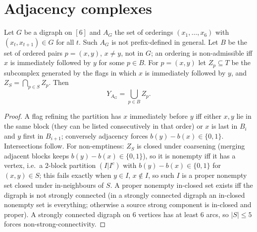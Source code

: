 \section{Adjacency complexes}\label{sec:adjacency}
Let $G$ be a digraph on $[6]$ and $A_G$ the set of orderings $(x_1,\dots,x_6)$ with $(x_t,x_{t+1})\in G$ for all $t$. Such $A_G$ is not prefix-defined in general. Let $B$ be the set of ordered pairs $p=(x,y)$, $x\ne y$, not in $G$; an ordering is non-admissible iff $x$ is immediately followed by $y$ for some $p\in B$. For $p=(x,y)$ let $Z_p\subseteq T$ be the subcomplex generated by the flags in which $x$ is immediately followed by $y$, and $Z_S=\bigcap_{p\in S}Z_p$. Then
\[
Y_{A_G}=\bigcup_{p\in B}Z_p .
\]
\begin{proof}
A flag refining the partition has $x$ immediately before $y$ iff either $x,y$ lie in the same block (they can be listed consecutively in that order) or $x$ is last in $B_i$ and $y$ first in $B_{i+1}$; conversely adjacency forces $b(y)-b(x)\in\{0,1\}$. Intersections follow. For non-emptiness: $Z_S$ is closed under coarsening (merging adjacent blocks keeps $b(y)-b(x)\in\{0,1\}$), so it is nonempty iff it has a vertex, i.e.\ a $2$-block partition $(I|I^c)$ with $b(y)-b(x)\in\{0,1\}$ for $(x,y)\in S$; this fails exactly when $y\in I$, $x\notin I$, so such $I$ is a proper nonempty set closed under in-neighbours of $S$. A proper nonempty in-closed set exists iff the digraph is not strongly connected (in a strongly connected digraph an in-closed nonempty set is everything; otherwise a source strong component is in-closed and proper). A strongly connected digraph on $6$ vertices has at least $6$ arcs, so $|S|\le5$ forces non-strong-connectivity.
\end{proof}

